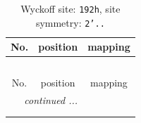 \documentclass[fleqn,8pt]{jsarticle}
\begin{document}
\renewcommand{\arraystretch}{1.2}
\begin{longtable}{ccc}
\caption{Wyckoff site: {\tt 192h}, site symmetry: {\tt 2'..}}
 \\
 \hline \hline
No. & position & mapping \\ \hline \endfirsthead

\multicolumn{2}{l}{\tablename\ \thetable{}} \\
 \hline \hline
No. & position & mapping \\ \hline \endhead

 \hline \hline
\multicolumn{2}{r}{\footnotesize\it continued ...} \\ \endfoot

 \hline \hline
\multicolumn{2}{r}{} \\ \endlastfoot


\end{longtable}
\end{document}
